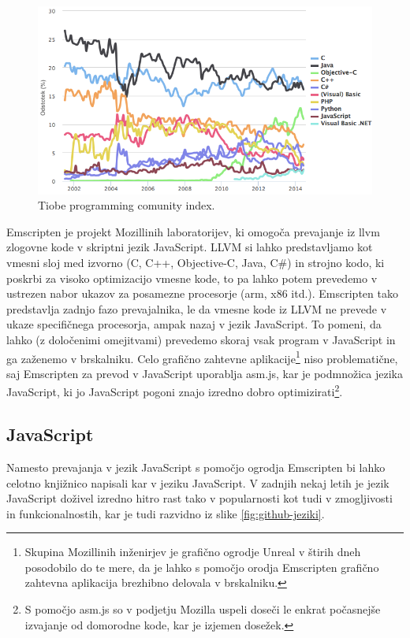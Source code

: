 \begin{figure}
 \includegraphics[width=\linewidth]{tiobe-index}
 \caption{Tiobe programming comunity index\cite{tiobe}.}
 \label{fig:tiobe-index}
\end{figure}

Emscripten je projekt Mozillinih laboratorijev, ki omogoča prevajanje iz \gls{llvm} zlogovne kode v skriptni jezik JavaScript. LLVM si lahko predstavljamo kot vmesni sloj med izvorno (C, C++, Objective-C, Java, C\#) in strojno kodo, ki poskrbi za visoko optimizacijo vmesne kode, to pa lahko potem prevedemo v ustrezen nabor ukazov za posamezne procesorje (\gls{arm}, x86 itd.). Emscripten tako predstavlja zadnjo fazo prevajalnika, le da vmesne kode iz LLVM ne prevede v ukaze specifičnega procesorja, ampak nazaj v jezik JavaScript. To pomeni, da lahko (z določenimi omejitvami) prevedemo skoraj vsak program v JavaScript in ga zaženemo v brskalniku. Celo grafično zahtevne aplikacije\footnote{Skupina Mozillinih inženirjev je grafično ogrodje Unreal v štirih dneh posodobilo do te mere, da je lahko s pomočjo orodja Emscripten grafično zahtevna aplikacija brezhibno delovala v brskalniku\cite{epic-citadel}.} niso problematične, saj Emscripten za prevod v JavaScript uporablja asm.js\cite{asmjs}, kar je podmnožica jezika JavaScript, ki jo JavaScript pogoni znajo izredno dobro optimizirati\footnote{S pomočjo asm.js so v podjetju Mozilla uspeli doseči le enkrat počasnejše izvajanje od domorodne kode, kar je izjemen dosežek.\cite{mozilla-asmjs}}.

\subsection{JavaScript}
\label{chap:javascript}

Namesto prevajanja v jezik JavaScript s pomočjo ogrodja Emscripten bi lahko celotno knjižnico napisali kar v jeziku JavaScript. V zadnjih nekaj letih je jezik JavaScript doživel izredno hitro rast tako v popularnosti kot tudi v zmogljivosti in funkcionalnostih, kar je tudi razvidno iz slike \ref{fig:github-jeziki}.

